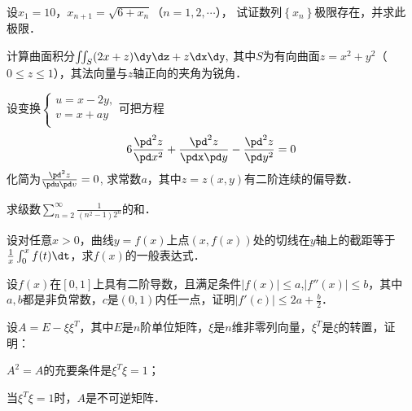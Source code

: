 \documentclass[plain,noanswer,medmath]{../../template/jnuexam}
\begin{document}
\begin{problem}
设$x_1 = 10$，$x_{n + 1} = \sqrt{6 + x_n}$（$n = 1,2, \cdots$），
试证数列$\left\{x_n \right\}$极限存在，并求此极限．
\end{problem}




\begin{problem}
计算曲面积分$\iint_S (2x + z)\dy\dz + z\dx\dy,$
其中$S$为有向曲面$z = x^2 + y^2$（$0 \le z \le 1$），其法向量与$z$轴正向的夹角为锐角．
\end{problem}


\begin{problem}
设变换$\begin{cases}
 u = x - 2y, \\
 v = x + ay \\
\end{cases}$可把方程
$$6\frac{\pd^2z}{\pd x^2} + \frac{\pd^2z}{\pdx\pd y} - \frac{\pd^2z}{\pd y^2} = 0$$
化简为$\frac{\pd^2 z}{\pdu\pd v} = 0$,
求常数$a$，其中$z = z(x,y)$有二阶连续的偏导数．
\end{problem}



\begin{problem}
求级数$\sum_{n = 2}^{\infty}\frac{1}{(n^2 - 1)2^n}$的和．
\end{problem}



\begin{problem}
设对任意$x > 0$，曲线$y = f(x)$上点$(x,f(x))$处的切线在$y$轴上的截距等于
$\frac{1}{x}\int_0^x f(t) \dt$，求$f(x)$的一般表达式．
\end{problem}



\begin{problem}
设$f(x)$在$[0,1]$上具有二阶导数，且满足条件$|f(x)| \le a$,$|f''(x)| \le b$，其中$a,b$都是非负常数，$c$是$(0,1)$内任一点，证明$|f'(c)| \le 2a + \frac{b}{2}$．
\end{problem}



\begin{problem}
设$A = E - \xi \xi^T$，其中$E$是$n$阶单位矩阵，$\xi$是$n$维非零列向量，$\xi^T$是$\xi$的转置，证明：\par
\begin{enumerate*}
\item $A^2 = A$的充要条件是$\xi^T\xi = 1$；
\item 当$\xi^T\xi = 1$时，$A$是不可逆矩阵．
\end{enumerate*}
\end{problem}
\end{document}
